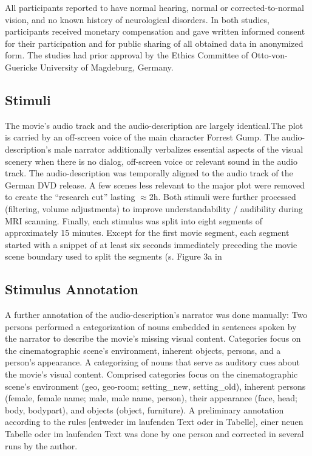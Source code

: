 \documentclass[english]{article}
\begin{document}
All participants reported to have normal hearing, normal or corrected-to-normal vision, and no known history of neurological disorders.
In both studies, participants received monetary compensation and gave written informed consent for their participation and for public sharing of all obtained data in anonymized form. The studies had prior approval by the Ethics Committee of Otto-von-Guericke University of Magdeburg, Germany.


\subsection{Stimuli}
The movie's  \citep{ForrestGumpMovie} audio track and the audio-description \citep{ForrestGumpGermanAD} are largely identical.The plot is carried by an off-screen voice of the main character Forrest Gump.
The audio-description's male narrator additionally verbalizes essential aspects of the visual scenery when there is no dialog, off-screen voice or relevant sound in the audio track.
The audio-description was temporally aligned to the audio track of the German DVD release. A few scenes less relevant to the major plot were removed to create the ``research cut'' lasting $\approx$2h. Both stimuli were further processed (filtering, volume adjustments) to improve understandability / audibility during MRI scanning.
Finally, each stimulus was split into eight segments of approximately 15 minutes. Except for the first movie segment, each segment started with a snippet of at least six seconds immediately preceding the movie scene boundary used to split the segments (s. Figure 3a in \citep{hanke2014audiomovie}


\subsection{Stimulus Annotation}
A further annotation of the audio-description's narrator was done manually: Two
persons performed a categorization of nouns embedded in sentences spoken by the
narrator to describe the movie's missing visual content.
Categories focus on the cinematographic scene's environment, inherent objects, persons, and a person's appearance.
A categorizing of nouns that serve as auditory cues about the movie's visual content. Comprised categories focus on the cinematographic scene's environment (geo, geo-room; setting\_new, setting\_old), inherent persons (female, female name; male, male name, person), their appearance (face, head; body, bodypart), and objects (object, furniture).
A preliminary annotation according to the rules [entweder im laufenden Text oder in Tabelle], einer neuen Tabelle oder im laufenden Text was done by one person and corrected in several runs by the author.
\end{document}
